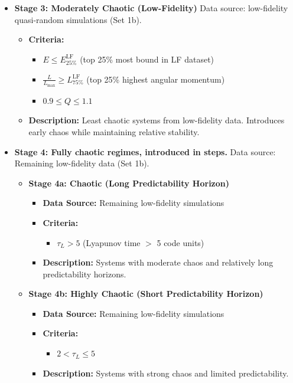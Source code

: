 \documentclass{article}
\begin{document}
\begin{itemize}
    
    \item \textbf{Stage 3: Moderately Chaotic (Low-Fidelity)}  Data source: low-fidelity quasi-random simulations (Set 1b).
    \begin{itemize}
        \item \textbf{Criteria:}
        \begin{itemize}
            \item $E \leq E^{\mathrm{LF}}_{25\%}$ \hspace{0.5em} (top 25\% most bound in LF dataset)
            \item $\frac{L}{L_{\max}} \geq L^{\mathrm{LF}}_{75\%}$ \hspace{0.5em} (top 25\% highest angular momentum)
            \item $0.9 \leq Q \leq 1.1$
        \end{itemize}
        \item \textbf{Description:} Least chaotic systems from low-fidelity data. Introduces early chaos while maintaining relative stability.
    \end{itemize}
    
    
    \item \textbf{Stage 4: Fully chaotic regimes, introduced in steps.} 
    Data source: Remaining low-fidelity data (Set 1b).  

    
    \begin{itemize}
        \item \textbf{Stage 4a: Chaotic (Long Predictability Horizon)}
        \begin{itemize}
            \item \textbf{Data Source:} Remaining low-fidelity simulations
            \item \textbf{Criteria:}
            \begin{itemize}
                \item $\tau_L > 5$ \hspace{0.5em} (Lyapunov time $>$ 5 code units)
            \end{itemize}
            \item \textbf{Description:} Systems with moderate chaos and relatively long predictability horizons.
        \end{itemize}
        
        \item \textbf{Stage 4b: Highly Chaotic (Short Predictability Horizon)}
        \begin{itemize}
            \item \textbf{Data Source:} Remaining low-fidelity simulations
            \item \textbf{Criteria:}
            \begin{itemize}
                \item $2 < \tau_L \leq 5$
            \end{itemize}
            \item \textbf{Description:} Systems with strong chaos and limited predictability.
        \end{itemize}
    \end{itemize}



\end{itemize}
\end{document}
